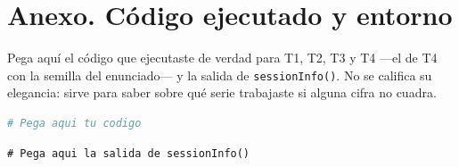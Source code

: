 \documentclass[11pt,a4paper,oneside]{article}
\begin{document}
\section*{Anexo. Código ejecutado y entorno}

Pega aquí el código que ejecutaste de verdad para T1, T2, T3 y T4 —el de T4 con la semilla del
enunciado— y la salida de \texttt{sessionInfo()}. No se califica su elegancia: sirve para saber sobre qué serie trabajaste si
alguna cifra no cuadra.

\begin{lstlisting}[language=R]
# Pega aqui tu codigo
\end{lstlisting}

\begin{lstlisting}
# Pega aqui la salida de sessionInfo()
\end{lstlisting}
\end{document}
